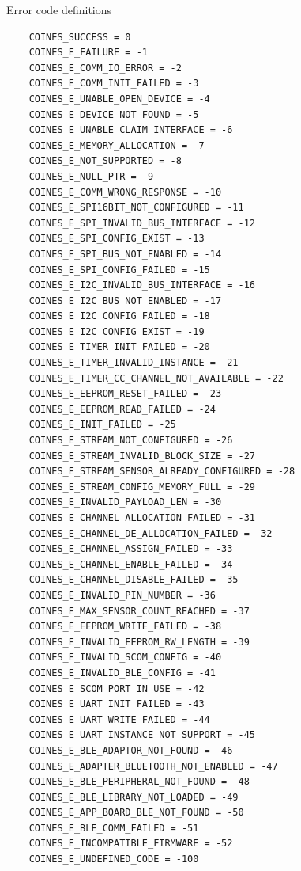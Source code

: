 \documentclass{article}
\begin{document}
Error code definitions
\begin{lstlisting}
    COINES_SUCCESS = 0
    COINES_E_FAILURE = -1
    COINES_E_COMM_IO_ERROR = -2
    COINES_E_COMM_INIT_FAILED = -3
    COINES_E_UNABLE_OPEN_DEVICE = -4
    COINES_E_DEVICE_NOT_FOUND = -5
    COINES_E_UNABLE_CLAIM_INTERFACE = -6
    COINES_E_MEMORY_ALLOCATION = -7
    COINES_E_NOT_SUPPORTED = -8
    COINES_E_NULL_PTR = -9
    COINES_E_COMM_WRONG_RESPONSE = -10
    COINES_E_SPI16BIT_NOT_CONFIGURED = -11
    COINES_E_SPI_INVALID_BUS_INTERFACE = -12
    COINES_E_SPI_CONFIG_EXIST = -13
    COINES_E_SPI_BUS_NOT_ENABLED = -14
    COINES_E_SPI_CONFIG_FAILED = -15
    COINES_E_I2C_INVALID_BUS_INTERFACE = -16
    COINES_E_I2C_BUS_NOT_ENABLED = -17
    COINES_E_I2C_CONFIG_FAILED = -18
    COINES_E_I2C_CONFIG_EXIST = -19
    COINES_E_TIMER_INIT_FAILED = -20
    COINES_E_TIMER_INVALID_INSTANCE = -21
    COINES_E_TIMER_CC_CHANNEL_NOT_AVAILABLE = -22
    COINES_E_EEPROM_RESET_FAILED = -23
    COINES_E_EEPROM_READ_FAILED = -24
    COINES_E_INIT_FAILED = -25
    COINES_E_STREAM_NOT_CONFIGURED = -26
    COINES_E_STREAM_INVALID_BLOCK_SIZE = -27
    COINES_E_STREAM_SENSOR_ALREADY_CONFIGURED = -28
    COINES_E_STREAM_CONFIG_MEMORY_FULL = -29
    COINES_E_INVALID_PAYLOAD_LEN = -30
    COINES_E_CHANNEL_ALLOCATION_FAILED = -31
    COINES_E_CHANNEL_DE_ALLOCATION_FAILED = -32
    COINES_E_CHANNEL_ASSIGN_FAILED = -33
    COINES_E_CHANNEL_ENABLE_FAILED = -34
    COINES_E_CHANNEL_DISABLE_FAILED = -35
    COINES_E_INVALID_PIN_NUMBER = -36
    COINES_E_MAX_SENSOR_COUNT_REACHED = -37
    COINES_E_EEPROM_WRITE_FAILED = -38
    COINES_E_INVALID_EEPROM_RW_LENGTH = -39
    COINES_E_INVALID_SCOM_CONFIG = -40
    COINES_E_INVALID_BLE_CONFIG = -41
    COINES_E_SCOM_PORT_IN_USE = -42
    COINES_E_UART_INIT_FAILED = -43
    COINES_E_UART_WRITE_FAILED = -44
    COINES_E_UART_INSTANCE_NOT_SUPPORT = -45
    COINES_E_BLE_ADAPTOR_NOT_FOUND = -46
    COINES_E_ADAPTER_BLUETOOTH_NOT_ENABLED = -47
    COINES_E_BLE_PERIPHERAL_NOT_FOUND = -48
    COINES_E_BLE_LIBRARY_NOT_LOADED = -49
    COINES_E_APP_BOARD_BLE_NOT_FOUND = -50
    COINES_E_BLE_COMM_FAILED = -51
    COINES_E_INCOMPATIBLE_FIRMWARE = -52
    COINES_E_UNDEFINED_CODE = -100
\end{lstlisting}
\end{document}
